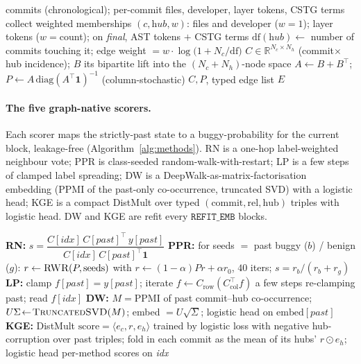 \documentclass[11pt,a4paper]{article}
\newcommand{\code}[1]{\texttt{#1}}
\begin{document}
	\begin{algorithm}[H]
	\caption{Build the commit--hub graph $(C,P)$ for a graph-family member}\label{alg:hub}
	\begin{algorithmic}[1]
	\Require commits (chronological); per-commit files, developer, layer tokens, CSTG terms
	\State collect weighted memberships $(c, \textit{hub}, w)$: files and developer ($w{=}1$); layer tokens ($w{=}$count); on \emph{final}, AST tokens $+$ CSTG terms
	\State $\mathrm{df}(\textit{hub})\gets$ number of commits touching it; edge weight $=w\cdot\log\!\big(1+N_c/\mathrm{df}\big)$
	\State $C \in \mathbb{R}^{N_c\times N_h}$ (commit$\times$hub incidence); $B$ its bipartite lift into the $(N_c{+}N_h)$-node space
	\State $A \gets B+B^{\!\top}$; \; $P \gets A\,\mathrm{diag}(A^{\!\top}\mathbf{1})^{-1}$ (column-stochastic)
	\State \Return $C,P$, typed edge list $E$
	\end{algorithmic}
	\end{algorithm}

	\paragraph{The five graph-native scorers.} Each scorer maps the strictly-past
	state to a buggy-probability for the current block, leakage-free
	(Algorithm~\ref{alg:methods}). RN is a one-hop label-weighted neighbour vote; PPR
	is class-seeded random-walk-with-restart; LP is a few steps of clamped label
	spreading; DW is a DeepWalk-as-matrix-factorisation embedding (PPMI of the
	past-only co-occurrence, truncated SVD) with a logistic head; KGE is a compact
	DistMult over typed $(\text{commit},\text{rel},\text{hub})$ triples with logistic
	head. DW and KGE are refit every $\code{REFIT\_EMB}$ blocks.

	\begin{algorithm}[H]
	\caption{The five graph-native scorers (block \textit{idx}, past \textit{past})}\label{alg:methods}
	\begin{algorithmic}[1]
	\State \textbf{RN:} $s = \dfrac{C[\textit{idx}]\,C[\textit{past}]^{\!\top}\,y[\textit{past}]}{C[\textit{idx}]\,C[\textit{past}]^{\!\top}\mathbf{1}}$ 
	\State \textbf{PPR:} for seeds $=$ past buggy ($b$) / benign ($g$): $r \gets \textsc{RWR}(P,\text{seeds})$ with $r\!\leftarrow\!(1{-}\alpha)Pr+\alpha r_0$, $40$ iters; \; $s = r_b/(r_b+r_g)$
	\State \textbf{LP:} clamp $f[\textit{past}]=y[\textit{past}]$; iterate $f \gets C_{\text{row}}(C_{\text{col}}^{\!\top} f)$ a few steps re-clamping past; read $f[\textit{idx}]$
	\State \textbf{DW:} $M=\mathrm{PPMI}$ of past commit--hub co-occurrence; $U\Sigma\!\gets\!\textsc{TruncatedSVD}(M)$; embed $=U\sqrt\Sigma$; logistic head on $\text{embed}[\textit{past}]$
	\State \textbf{KGE:} DistMult $\mathrm{score}=\langle e_c, r, e_h\rangle$ trained by logistic loss with negative hub-corruption over past triples; fold in each commit as the mean of its hubs' $r\!\odot\!e_h$; logistic head
	\State \Return per-method scores on \textit{idx}
	\end{algorithmic}
	\end{algorithm}
\end{document}
